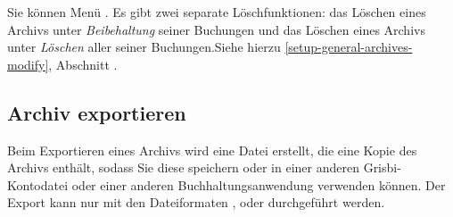 Sie können  Menü . Es gibt zwei separate Löschfunktionen: das Löschen eines Archivs unter \emph{Beibehaltung} seiner Buchungen und das Löschen eines Archivs unter \emph{Löschen} aller seiner Buchungen.Siehe hierzu \vref{setup-general-archives-modify}, Abschnitt . 

\subsection{Archiv exportieren\label{datamanagement-archive-export}}

Beim Exportieren eines Archivs wird eine Datei erstellt, die eine Kopie des Archivs enthält, sodass Sie diese speichern oder in einer anderen Grisbi-Kontodatei oder einer anderen Buchhaltungsanwendung verwenden können. Der Export kann nur mit den Dateiformaten ,  oder  durchgeführt werden.

